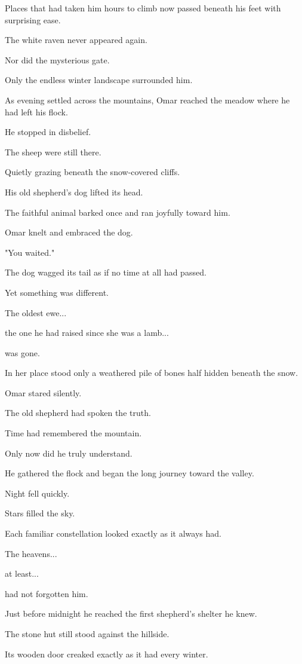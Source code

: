 \documentclass[12pt,openany]{book}
\begin{document}
Places that had taken him hours to climb now passed beneath his feet with surprising ease.

The white raven never appeared again.

Nor did the mysterious gate.

Only the endless winter landscape surrounded him.

As evening settled across the mountains, Omar reached the meadow where he had left his flock.

He stopped in disbelief.

The sheep were still there.

Quietly grazing beneath the snow-covered cliffs.

His old shepherd's dog lifted its head.

The faithful animal barked once and ran joyfully toward him.

Omar knelt and embraced the dog.

"You waited."

The dog wagged its tail as if no time at all had passed.

Yet something was different.

The oldest ewe...

the one he had raised since she was a lamb...

was gone.

In her place stood only a weathered pile of bones half hidden beneath the snow.

Omar stared silently.

The old shepherd had spoken the truth.

Time had remembered the mountain.

Only now did he truly understand.

He gathered the flock and began the long journey toward the valley.

Night fell quickly.

Stars filled the sky.

Each familiar constellation looked exactly as it always had.

The heavens...

at least...

had not forgotten him.

Just before midnight he reached the first shepherd's shelter he knew.

The stone hut still stood against the hillside.

Its wooden door creaked exactly as it had every winter.
\end{document}
